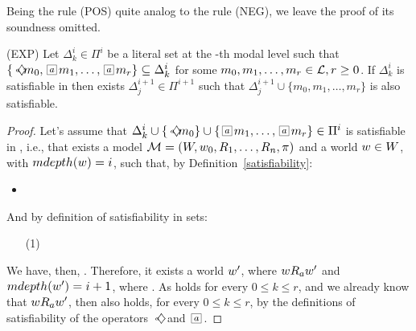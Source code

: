 Being the rule (POS) quite analog to the rule (NEG), we leave the proof of its
soundness omitted.

\begin{lemma}{(EXP)} Let $\Delta^i_k \in \Pi^i$ be a literal set at the \ml-th
    modal level such that $\{\pos{a} m_0, \nec{a} m_1, \ldots, \nec{a} m_r\}
    \subseteq \Delta^i_k$ for some $m_0, m_1, \ldots, m_r \in \Literals, r \geq 0$.
    If $\Delta^i_k$ is satisfiable in  then exists
    $\Delta^{i+1}_j \in \Pi^{i+1}$ such that $\Delta^{i+1}_j \cup \{m_0, m_1,
    \ldots, m_r\}$ is also satisfiable.
\end{lemma}
\begin{proof}
    Let's assume that $\Delta^i_k \cup \{\pos{a}m_0\} \cup \{\nec{a}m_1, \ldots,
    \nec{a}m_r\} \in \Pi^i$ is satisfiable in , i.e., that exists
    a model $\Model = (W, \st_0, R_1, \ldots, R_n, \pi)$ and a world $\st \in
    W$, with $mdepth(\st) = \ml$, such that, by Definition~\ref{satisfiability}:
    \begin{itemize}
        \item
    \end{itemize}
    And by definition of satisfiability in sets:
    \begin{itemize}
        \item[(1)]
    \end{itemize}
    We have, then, . Therefore, it exists a world
    $\st'$, where $\st R_a \st'$ and $mdepth(\st')=\ml + 1$, where
    . As  holds for every $0
    \leq k \leq r$, and we already know that $\st R_a \st'$, then
     also holds, for every $0 \leq k \leq r$, by the
    definitions of satisfiability of the operators $\pos{a}$ and $\nec{a}$.


\end{proof}
